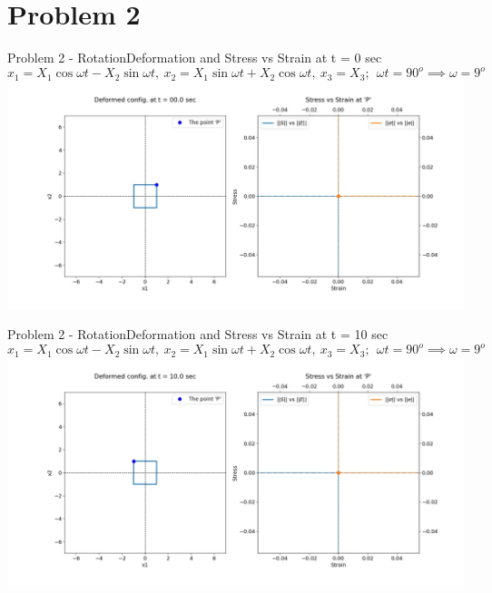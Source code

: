 \documentclass{beamer}
\begin{document}
\section{Problem 2}

\begin{frame}{Problem 2 - Rotation}{Deformation and Stress vs Strain at t = 0 sec}
    \vspace{-2em}
    \scriptsize $$x_1 = X_1\cos\omega t - X_2\sin\omega t,\ x_2 = X_1\sin\omega t + X_2\cos\omega t,\ x_3 = X_3;\ \ \omega t = 90^o \implies \omega = 9^o$$
    \includegraphics[width=\textwidth, trim={4.5cm 2cm 3cm 1cm}, clip]{Plots/irotation.jpg}
\end{frame}

\begin{frame}{Problem 2 - Rotation}{Deformation and Stress vs Strain at t = 10 sec}
    \vspace{-2em}
    \scriptsize $$x_1 = X_1\cos\omega t - X_2\sin\omega t,\ x_2 = X_1\sin\omega t + X_2\cos\omega t,\ x_3 = X_3;\ \ \omega t = 90^o \implies \omega = 9^o$$
    \includegraphics[width=\textwidth, trim={4.5cm 2cm 3cm 1cm}, clip]{Plots/rotation.jpg}
\end{frame}
\end{document}
